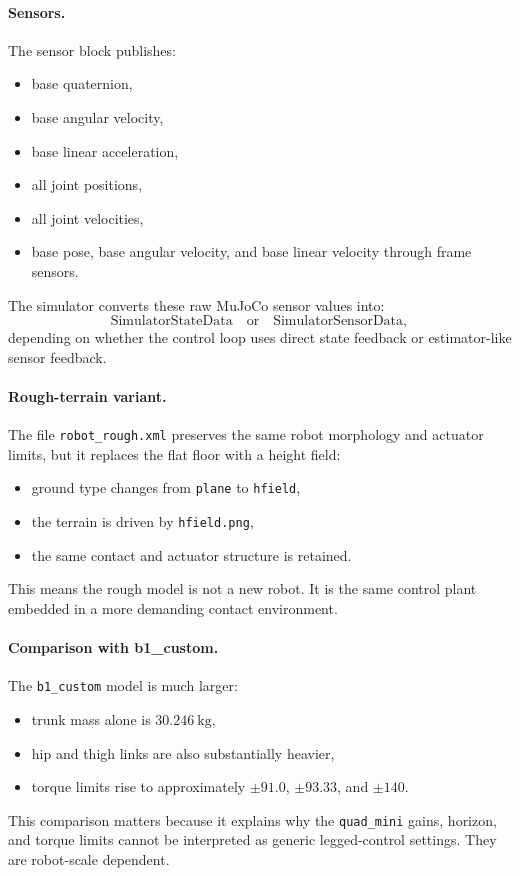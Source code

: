\documentclass[11pt,a4paper]{article}
\newcommand{\code}[1]{\texttt{#1}}
\begin{document}
\paragraph{Sensors.}
The sensor block publishes:
\begin{itemize}[leftmargin=*]
  \item base quaternion,
  \item base angular velocity,
  \item base linear acceleration,
  \item all joint positions,
  \item all joint velocities,
  \item base pose, base angular velocity, and base linear velocity through frame sensors.
\end{itemize}

The simulator converts these raw MuJoCo sensor values into:
\begin{equation}
\text{SimulatorStateData} \quad \text{or} \quad \text{SimulatorSensorData},
\end{equation}
depending on whether the control loop uses direct state feedback or estimator-like sensor feedback.

\paragraph{Rough-terrain variant.}
The file \code{robot\_rough.xml} preserves the same robot morphology and actuator limits, but it replaces the flat floor with a height field:
\begin{itemize}[leftmargin=*]
  \item ground type changes from \code{plane} to \code{hfield},
  \item the terrain is driven by \code{hfield.png},
  \item the same contact and actuator structure is retained.
\end{itemize}
This means the rough model is not a new robot. It is the same control plant embedded in a more demanding contact environment.

\paragraph{Comparison with b1\_custom.}
The \code{b1\_custom} model is much larger:
\begin{itemize}[leftmargin=*]
  \item trunk mass alone is $30.246~\mathrm{kg}$,
  \item hip and thigh links are also substantially heavier,
  \item torque limits rise to approximately $\pm 91.0$, $\pm 93.33$, and $\pm 140$.
\end{itemize}
This comparison matters because it explains why the \code{quad\_mini} gains, horizon, and torque limits cannot be interpreted as generic
legged-control settings. They are robot-scale dependent.
\end{document}
